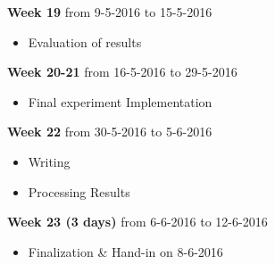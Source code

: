 \documentclass[singleside,openright]{uva-bachelor-thesis}
\newenvironment{week}[3]{
\newcommand{\topic}{\item}
\vspace{2mm} %
\noindent
\textbf{Week #1} from #2 to #3
\begin{itemize}[nolistsep]
}{
\end{itemize}
}
\begin{document}
\begin{week}{19}{9-5-2016}{15-5-2016}
\topic Evaluation of results
\end{week}

\begin{week}{20-21}{16-5-2016}{29-5-2016}
\topic Final experiment Implementation
\end{week}

\begin{week}{22}{30-5-2016}{5-6-2016}
\topic Writing
\topic Processing Results
\end{week}

\begin{week}{23 (3 days)}{6-6-2016}{12-6-2016}
\topic Finalization \& Hand-in on 8-6-2016
\end{week}




\printbibliography
\end{document}
